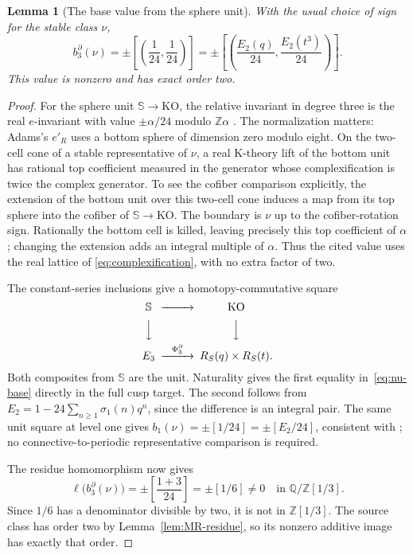 \documentclass[11pt,a4paper]{amsart}
\newcommand{\Z}{\mathbb Z}
\newcommand{\Q}{\mathbb Q}
\newcommand{\KO}{\mathrm{KO}}
\theoremstyle{plain}
\newtheorem{lemma}[theorem]{Lemma}
\theoremstyle{definition}
\theoremstyle{remark}
\begin{document}
\begin{lemma}[The base value from the sphere unit]\label{lem:e-nonzero}
With the usual choice of sign for the stable class $\nu$,
\begin{equation}\label{eq:nu-base}
 b_3^\partial(\nu)
   =\pm\left[\left(\frac1{24},\frac1{24}\right)\right]
   =\pm\left[\left(\frac{E_2(q)}{24},
                         \frac{E_2(t^3)}{24}\right)\right].
\end{equation}
This value is nonzero and has exact order two.
\end{lemma}
\begin{proof}
For the sphere unit $\mathbb S\to\KO$, the relative invariant
in degree three is the real $e$-invariant with value
$\pm\alpha/24$ modulo $\Z\alpha$
\cite[Section~7, equation~(7.3), Theorem~7.16 and Example~7.17]{AdamsJIV}.
The normalization matters: Adams's $e'_R$ uses a bottom sphere
of dimension zero modulo eight. On the two-cell cone of a stable
representative of $\nu$, a real K-theory lift of the bottom
unit has rational top coefficient measured in the generator whose
complexification is twice the complex generator. To see the cofiber comparison explicitly, the extension of the
bottom unit over this two-cell cone induces a map from its top
sphere into the cofiber of $\mathbb S\to\KO$. The boundary is
$\nu$ up to the cofiber-rotation sign. Rationally the bottom cell
is killed, leaving precisely this top coefficient of $\alpha$;
changing the extension adds an integral multiple of $\alpha$.
Thus the cited value uses the real lattice of
\eqref{eq:complexification}, with no extra factor of two.

The constant-series inclusions give a homotopy-commutative square
\[
\begin{CD}
 \mathbb S @>>> \KO\\
 @VVV @VVV\\
 E_3 @>{\Phi_3^\partial}>> R_S(q)\times R_S(t).
\end{CD}
\]
Both composites from $\mathbb S$ are the unit. Naturality gives
the first equality in~\eqref{eq:nu-base} directly in the full
cusp target. The second follows from
$E_2=1-24\sum_{n\ge1}\sigma_1(n)q^n$, since the difference is
an integral pair. The same unit square at level one gives
$b_1(\nu)=\pm[1/24]=\pm[E_2/24]$, consistent with
\cite[Section~3.7, equation~(31)]{BN}; no connective-to-periodic
representative comparison is required.

The residue homomorphism now gives
\[
 \ell\bigl(b_3^\partial(\nu)\bigr)
      =\pm\left[\frac{1+3}{24}\right]
      =\pm[1/6]\ne0\quad\text{in }\Q/\Z[1/3].
\]
Since $1/6$ has a denominator divisible by two, it is not in
$\Z[1/3]$. The source class has order two by
Lemma~\ref{lem:MR-residue}, so its nonzero additive image has
exactly that order.
\end{proof}
\end{document}

